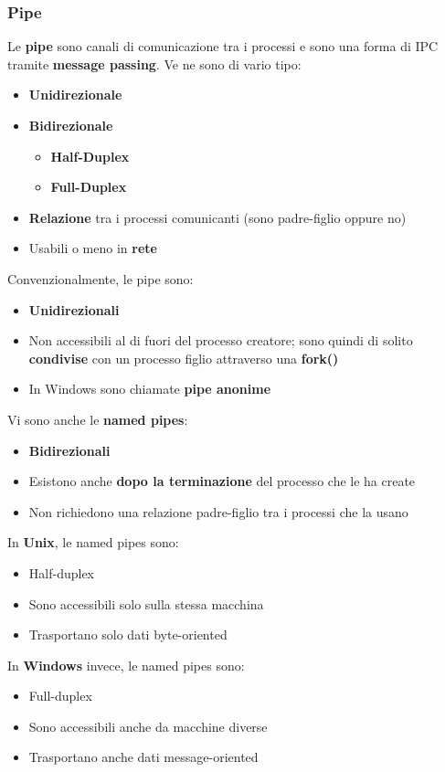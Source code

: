 \documentclass[12pt]{article}
\begin{document}
\subsubsection{Pipe}
Le \textbf{pipe} sono canali di comunicazione tra i processi e sono una forma di IPC tramite \textbf{message passing}.
Ve ne sono di vario tipo:
\begin{itemize}
    \item \textbf{Unidirezionale}
    \item \textbf{Bidirezionale}
    \begin{itemize}
        \item \textbf{Half-Duplex}
        \item \textbf{Full-Duplex}
    \end{itemize}
    \item \textbf{Relazione} tra i processi comunicanti (sono padre-figlio oppure no)
    \item Usabili o meno in \textbf{rete}
\end{itemize}
Convenzionalmente, le pipe sono:
\begin{itemize}
    \item \textbf{Unidirezionali}
    \item Non accessibili al di fuori del processo creatore; sono quindi di solito \textbf{condivise} con un processo figlio attraverso una \textbf{fork()}
    \item In Windows sono chiamate \textbf{pipe anonime}
\end{itemize}
Vi sono anche le \textbf{named pipes}:
\begin{itemize}
    \item \textbf{Bidirezionali}
    \item Esistono anche \textbf{dopo la terminazione} del processo che le ha create 
    \item Non richiedono una relazione padre-figlio tra i processi che la usano
\end{itemize}
In \textbf{Unix}, le named pipes sono:
\begin{itemize}
    \item Half-duplex
    \item Sono accessibili solo sulla stessa macchina
    \item Trasportano solo dati byte-oriented
\end{itemize}
In \textbf{Windows} invece, le named pipes sono:
\begin{itemize}
    \item Full-duplex
    \item Sono accessibili anche da macchine diverse
    \item Trasportano anche dati message-oriented
\end{itemize}
\end{document}
